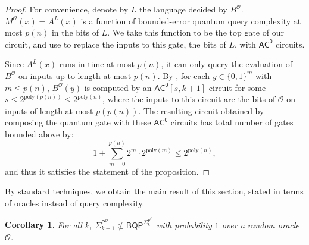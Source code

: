 \documentclass[11pt]{article}%
\newtheorem{corollary}[theorem]{Corollary}
\newcommand{\poly}{\mathrm{poly}}
\begin{document}
\begin{proof}
For convenience, denote by $L$ the language decided by $B^\mathcal{O}$. $M^\mathcal{O}(x) = A^{L}(x)$ is a function of bounded-error quantum query complexity at most $p(n)$ in the bits of $L$. We take this function to be the top gate of our circuit, and use  to replace the inputs to this gate, the bits of $L$, with $\mathsf{AC^0}$ circuits.

Since $A^{L}(x)$ runs in time at most $p(n)$, it can only query the evaluation of $B^\mathcal{O}$ on inputs up to length at most $p(n)$. By , for each $y \in \{0,1\}^{m}$ with $m \le p(n)$, $B^\mathcal{O}(y)$ is computed by an $\mathsf{AC^0}\left[s, k+1 \right]$ circuit for some $s \le 2^{\poly(p(n))} \le 2^{\poly(n)}$, where the inputs to this circuit are the bits of $\mathcal{O}$ on inputs of length at most $p(p(n))$. The resulting circuit obtained by composing the quantum gate with these $\mathsf{AC^0}$ circuits has total number of gates bounded above by:
\[
1 + \sum_{m=0}^{p(n)} 2^{m} \cdot 2^{\poly(m)} \le 2^{\poly(n)},
\]
and thus it satisfies the statement of the proposition.
\end{proof}

By standard techniques, we obtain the main result of this section, stated in terms of oracles instead of query complexity.

\begin{corollary}
\label{cor:bqp_sigma_k}
For all $k$, $\mathsf{\Sigma}_{k+1}^{\mathsf{P}^\mathcal{O}} \not\subset \mathsf{BQP}^{\mathsf{\Sigma}_k^{\mathsf{P}^\mathcal{O}}}$ with probability $1$ over a random oracle $\mathcal{O}$.
\end{corollary}
\end{document}
